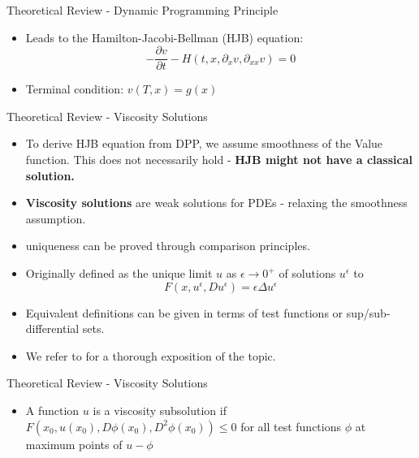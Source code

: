 \documentclass{beamer}
\newcommand{\highlight}[1]{{
\bf{#1}
}}
\begin{document}
{\begin{frame}{Theoretical Review - Dynamic Programming Principle}
\begin{itemize}
    \item Leads to the Hamilton-Jacobi-Bellman (HJB) equation:
    \begin{equation}
        -\frac{\partial v}{\partial t} - H(t,x,\partial_x v, \partial_{xx} v) = 0
    \end{equation}
    \item Terminal condition: $v(T,x) = g(x)$
\end{itemize}
\end{frame}

\begin{frame}{Theoretical Review - Viscosity Solutions}

    \begin{itemize}
        \item To derive HJB equation from DPP, we assume smoothness of the Value function. This does not necessarily hold - \highlight{HJB might not have a classical solution.}
        \item \highlight{Viscosity solutions} are weak solutions for PDEs - relaxing the smoothness assumption. 
        \item uniqueness can be proved through comparison principles.
        \item Originally defined as the unique limit $u$ as $\epsilon \to 0^+$ of solutions $u^\epsilon$ to
        \begin{equation*}
        F(x, u^\epsilon, D u^\epsilon) = \epsilon \Delta u^\epsilon
        \end{equation*}
        \item Equivalent definitions can be given in terms of test functions or sup/sub-differential sets. 
        \item We refer to \cite{pham2009continuous,bressan2007introduction,lopes1997introduccao,crandall1992user} for a thorough exposition of the topic.
        
    \end{itemize}

    
\end{frame}

\begin{frame}{Theoretical Review - Viscosity Solutions}
\begin{definition}
    \begin{itemize}
        \item A function $u$ is a viscosity subsolution if
        $F(x_0, u(x_0), D \phi(x_0), D^2 \phi(x_0)) \leq 0$
        for all test functions $\phi$ at maximum points of $u - \phi$
        

\end{itemize}
\end{definition}
\end{frame}}
\end{document}

